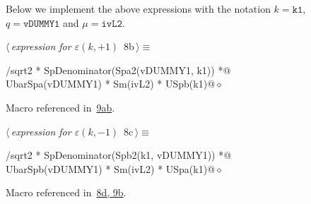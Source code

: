 \documentclass[a4paper,12pt]{amsart}
\renewcommand{\NWtarget}[2]{\hypertarget{#1}{#2}}
\renewcommand{\NWlink}[2]{\hyperlink{#1}{#2}}
\renewcommand{\NWtxtMacroRefIn}{Macro referenced in}
\renewcommand{\NWsep}{${\diamond}$}
\begin{document}
Below we implement the above expressions with the notation
$k=\mathtt{k1}$, $q=\mathtt{vDUMMY1}$ and $\mu=\mathtt{ivL2}$.
\begin{flushleft} \small
\begin{minipage}{\linewidth}\label{scrap19}\raggedright\small
\NWtarget{nuweb8b}{} $\langle\,${\itshape expression for $\varepsilon(k, +1)$}\nobreak\ {\footnotesize {8b}}$\,\rangle\equiv$
\vspace{-1ex}
\begin{list}{}{} \item
\mbox{}/sqrt2 * SpDenominator(Spa2(vDUMMY1, k1)) *@\\
\mbox{}\verb@        UbarSpa(vDUMMY1) * Sm(ivL2) * USpb(k1)@{\NWsep}
\end{list}
\vspace{-1.5ex}
\footnotesize
\begin{list}{}{\setlength{\itemsep}{-\parsep}\setlength{\itemindent}{-\leftmargin}}
\item \NWtxtMacroRefIn\ \NWlink{nuweb9a}{9a}\NWlink{nuweb9b}{b}.

\item{}
\end{list}
\end{minipage}\vspace{4ex}
\end{flushleft}
\begin{flushleft} \small
\begin{minipage}{\linewidth}\label{scrap20}\raggedright\small
\NWtarget{nuweb8c}{} $\langle\,${\itshape expression for $\varepsilon(k, -1)$}\nobreak\ {\footnotesize {8c}}$\,\rangle\equiv$
\vspace{-1ex}
\begin{list}{}{} \item
\mbox{}/sqrt2 * SpDenominator(Spb2(k1, vDUMMY1)) *@\\
\mbox{}\verb@        UbarSpb(vDUMMY1) * Sm(ivL2) * USpa(k1)@{\NWsep}
\end{list}
\vspace{-1.5ex}
\footnotesize
\begin{list}{}{\setlength{\itemsep}{-\parsep}\setlength{\itemindent}{-\leftmargin}}
\item \NWtxtMacroRefIn\ \NWlink{nuweb8d}{8d}\NWlink{nuweb9b}{, 9b}.

\item{}
\end{list}
\end{minipage}\vspace{4ex}
\end{flushleft}
\end{document}
